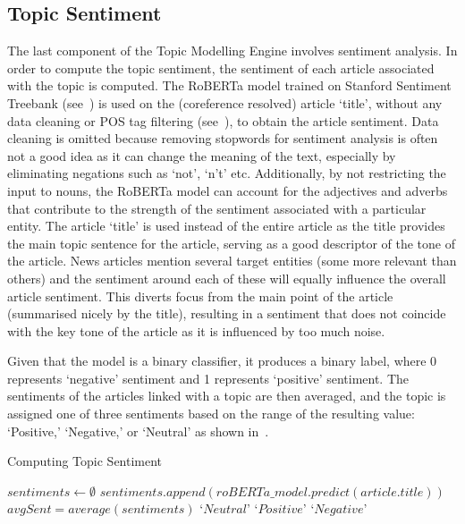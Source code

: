 \vspace{-2em}
\subsection{Topic Sentiment}

The last component of the Topic Modelling Engine involves sentiment analysis. In order to compute the topic sentiment, the sentiment of each article associated with the topic is computed. The RoBERTa model trained on Stanford Sentiment Treebank (see~) is used on the (coreference resolved) article `title', without any data cleaning or POS tag filtering (see~), to obtain the article sentiment. Data cleaning is omitted because removing stopwords for sentiment analysis is often not a good idea as it can change the meaning of the text, especially by eliminating negations such as `not', `n't' etc. Additionally, by not restricting the input to nouns, the RoBERTa model can account for the adjectives and adverbs that contribute to the strength of the sentiment associated with a particular entity. The article `title' is used instead of the entire article as the title provides the main topic sentence for the article, serving as a good descriptor of the tone of the article. News articles mention several target entities (some more relevant than others) and the sentiment around each of these will equally influence the overall article sentiment. This diverts focus from the main point of the article (summarised nicely by the title), resulting in a sentiment that does not coincide with the key tone of the article as it is influenced by too much noise.

Given that the model is a binary classifier, it produces a binary label, where 0 represents `negative' sentiment and 1 represents `positive' sentiment. The sentiments of the articles linked with a topic are then averaged, and the topic is assigned one of three sentiments based on the range of the resulting value: `Positive,' `Negative,' or `Neutral' as shown in~.
\vspace{-2em}
\begin{algorithm}[H]
  \caption{Computing Topic Sentiment}
  \label{alg:topic_sent}
  \begin{algorithmic}   
    \State $sentiments \gets  \emptyset$
    \State $\mathit{sentiments.append(roBERTa\_model.predict(article.title))}$ 
    \EndFor
    \State $avgSent = average(sentiments)$
    \State \Return `$Neutral$'
      \State \Return `$Positive$'
    \Else  \State \Return `$Negative$'\EndIf
  \EndFunction
\end{algorithmic}
\end{algorithm}


